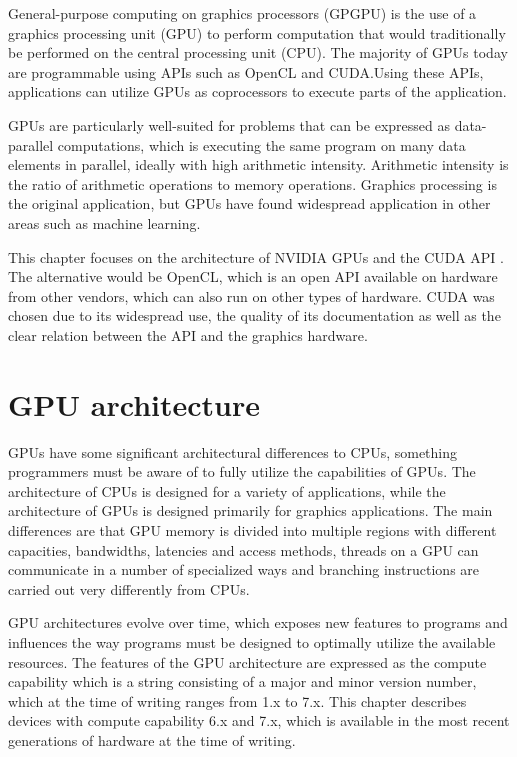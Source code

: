 General-purpose computing on graphics processors (GPGPU) is the use of a graphics processing unit (GPU) to perform computation that would traditionally be performed on the central processing unit (CPU). The majority of GPUs today are programmable using APIs such as OpenCL and CUDA.\@ Using these APIs, applications can utilize GPUs as coprocessors to execute parts of the application.

GPUs are particularly well-suited for problems that can be expressed as data-parallel computations, which is executing the same program on many data elements in parallel, ideally with high arithmetic intensity. Arithmetic intensity is the ratio of arithmetic operations to memory operations. Graphics processing is the original application, but GPUs have found widespread application in other areas such as machine learning.

This chapter focuses on the architecture of NVIDIA GPUs and the CUDA API \cite{nvidia2019cuda}. The alternative would be OpenCL, which is an open API available on hardware from other vendors, which can also run on other types of hardware. CUDA was chosen due to its widespread use, the quality of its documentation as well as the clear relation between the API and the graphics hardware.

\section{GPU architecture}

GPUs have some significant architectural differences to CPUs, something programmers must be aware of to fully utilize the capabilities of GPUs. The architecture of CPUs is designed for a variety of applications, while the architecture of GPUs is designed primarily for graphics applications. The main differences are that GPU memory is divided into multiple regions with different capacities, bandwidths, latencies and access methods, threads on a GPU can communicate in a number of specialized ways and branching instructions are carried out very differently from CPUs.

GPU architectures evolve over time, which exposes new features to programs and influences the way programs must be designed to optimally utilize the available resources. The features of the GPU architecture are expressed as the compute capability which is a string consisting of a major and minor version number, which at the time of writing ranges from 1.x to 7.x. This chapter describes devices with compute capability 6.x and 7.x, which is available in the most recent generations of hardware at the time of writing.

